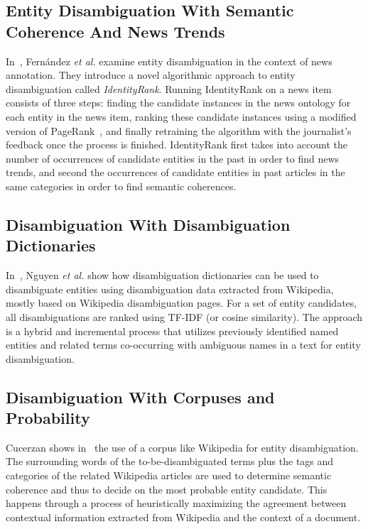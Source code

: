 \subsection{Entity Disambiguation With Semantic Coherence And News Trends}
In~\cite{Fernandez:IdentityRank}, Fern\'{a}ndez \emph{et al.} examine entity disambiguation in the context of news annotation.
They introduce a novel algorithmic approach to entity disambiguation called \textit{IdentityRank}. Running IdentityRank
on a news item consists of three steps: finding the candidate instances in the news ontology for each entity in the
news item, ranking these candidate instances using a modified version of PageRank~\cite{Brin:PageRank}, and finally
retraining the algorithm with the journalist's feedback once the process is finished. IdentityRank first takes into
account the number of occurrences of candidate entities in the past in order to find news trends, and second the
occurrences of candidate entities in past articles in the same categories in order to find semantic coherences.

\subsection{Disambiguation With Disambiguation Dictionaries}
In~\cite{Nguyen:NamedEntity}, Nguyen \emph{et al.} show how disambiguation dictionaries can be used to disambiguate entities
using disambiguation data extracted from Wikipedia, mostly based on Wikipedia 
disambiguation pages. For a set of entity 
candidates, all disambiguations are ranked using TF-IDF (or cosine similarity). The approach is a hybrid and incremental process that utilizes previously identified named
entities and related terms co-occurring with ambiguous names in a text for entity disambiguation.

\subsection{Disambiguation With Corpuses and Probability}
Cucerzan shows in~\cite{Cucerzan:Wikipedia} the use of a corpus like Wikipedia for entity disambiguation. The
surrounding words of the to-be-disambiguated terms plus the tags and categories of the related Wikipedia articles are
 used to determine semantic coherence and thus to decide on the most probable entity candidate. This happens
through a process of heuristically maximizing the agreement between contextual information extracted from Wikipedia and
the context of a document.

